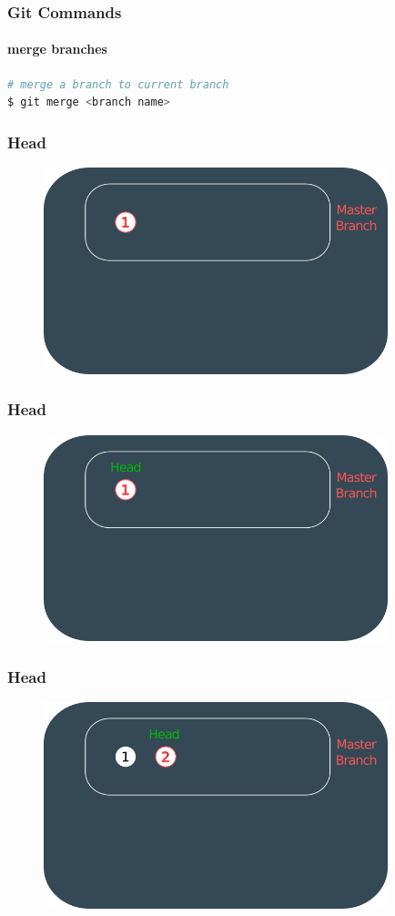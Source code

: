 \documentclass{beamer}
\begin{document}
	\begin{frame}[fragile]
		\frametitle{Git Commands}
		\framesubtitle{merge branches}	
		
\begin{lstlisting}[language=bash]
# merge a branch to current branch
$ git merge <branch name>
\end{lstlisting}
	
	\end{frame}
	
	\begin{frame}
		\frametitle{Head}
		\begin{figure}[htbp]
			\centering
			\includegraphics[width=10cm]{head1}
		\end{figure}
	\end{frame}
	
	\begin{frame}
		\frametitle{Head}
		\begin{figure}[htbp]
			\centering
			\includegraphics[width=10cm]{head2}
		\end{figure}
	\end{frame}
	
	\begin{frame}
		\frametitle{Head}
		\begin{figure}[htbp]
			\centering
			\includegraphics[width=10cm]{head3}
		\end{figure}
	\end{frame}
	
\end{document}
